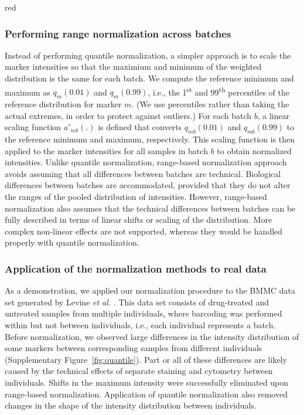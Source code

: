 \documentclass{article}
\begin{document}
\begin{color}{red}
\subsubsection{Performing range normalization across batches}
Instead of performing quantile normalization, a simpler approach is to scale the marker intensities so that the maximium and minimum of the weighted distribution is the same for each batch.
We compute the reference minimum and maximum as $q_m(0.01)$ and $q_m(0.99)$, i.e., the 1\textsuperscript{st} and 99\textsuperscript{th} percentiles of the reference distribution for marker $m$.
(We use percentiles rather than taking the actual extremes, in order to protect against outliers.)
For each batch $b$, a linear scaling function $a'_{mb}(.)$ is defined that converts $q_{mb}(0.01)$ and $q_{mb}(0.99)$ to the reference minimum and maximum, respectively.
This scaling function is then applied to the marker intensities for all samples in batch $b$ to obtain normalized intensities.
Unlike quantile normalization, range-based normalization approach avoids assuming that all differences between batches are technical.
Biological differences between batches are accommodated, provided that they do not alter the ranges of the pooled distribution of intensities.
However, range-based normalization also assumes that the technical differences between batches can be fully described in terms of linear shifts or scaling of the distribution.
More complex non-linear effects are not supported, whereas they would be handled properly with quantile normalization.

\subsubsection{Application of the normalization methods to real data}
As a demonstration, we applied our normalization procedure to the BMMC data set generated by Levine \textit{et al.} \cite{levine2015datadriven}.
This data set consists of drug-treated and untreated samples from multiple individuals, where barcoding was performed within but not between individuals, i.e., each individual represents a batch.
Before normalization, we observed large differences in the intensity distribution of some markers between corresponding samples from different individuals (Supplementary Figure~\ref{fig:quantile}).
Part or all of these differences are likely caused by the technical effects of separate staining and cytometry between individuals.
Shifts in the maximum intensity were successfully eliminated upon range-based normalization.
Application of quantile normalization also removed changes in the shape of the intensity distribution between individuals.


\end{color}
\end{document}
